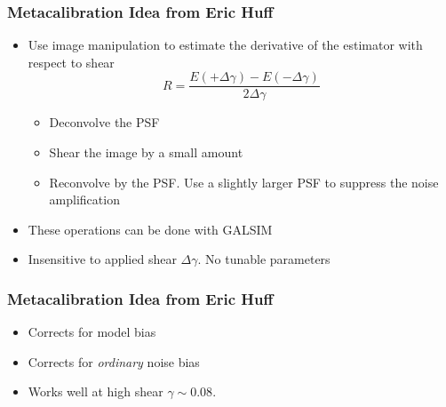\documentclass{beamer}
\begin{document}
\frame
{
    \frametitle{Metacalibration Idea from Eric Huff}


    \begin{itemize}

        \item Use image manipulation to estimate the derivative of the
            estimator with respect to shear
            {\color{gold}
                \begin{equation}
                    R = \frac{E(+\Delta\gamma) - E(-\Delta\gamma)}{2 \Delta \gamma} \nonumber 
                \end{equation}
            }
            \begin{itemize}
                \item Deconvolve the PSF
                \item Shear the image by a small amount
                \item Reconvolve by the PSF.  Use a slightly larger PSF to suppress
                    the noise amplification
            \end{itemize}

            \item These operations can be done with GALSIM
            \item Insensitive to applied shear $\Delta \gamma$.  {\color{lightskyblue} No tunable parameters}


    \end{itemize}

}

\frame
{
    \frametitle{Metacalibration Idea from Eric Huff}

 
    \begin{itemize}
        
        \item Corrects for {\color{lightskyblue} model bias}

        \item Corrects for {\em ordinary} {\color{gold} noise bias}

        \item Works well at {\color{lightsteelblue} high shear $\gamma \sim 0.08$}.

    \end{itemize}

}
\end{document}
